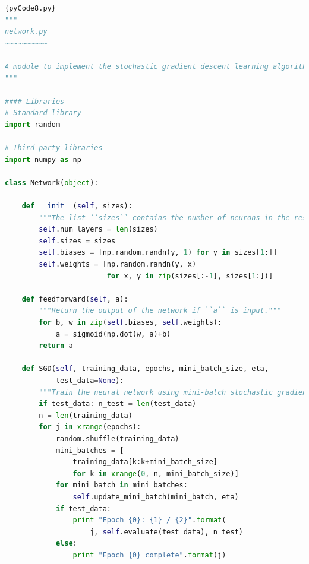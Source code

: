 \documentclass[a4paper,12pt]{report}%
\begin{document}
\begin{lstlisting}[language=Python,breaklines,basicstyle=\footnotesize\ttfamily]{pyCode8.py}
"""
network.py
~~~~~~~~~~

A module to implement the stochastic gradient descent learning algorithm for a feedforward neural network.  Gradients are calculated using backpropagation.  Note that I have focused on making the code simple, easily readable, and easily modifiable.  It is not optimized, and omits many desirable features.
"""

#### Libraries
# Standard library
import random

# Third-party libraries
import numpy as np

class Network(object):

    def __init__(self, sizes):
        """The list ``sizes`` contains the number of neurons in the respective layers of the network.  For example, if the list was [2, 3, 1] then it would be a three-layer network, with the first layer containing 2 neurons, the second layer 3 neurons, and the third layer 1 neuron.  The biases and weights for the network are initialized randomly, using a Gaussian distribution with mean 0, and variance 1.  Note that the first layer is assumed to be an input layer, and by convention we won't set any biases for those neurons, since biases are only ever used in computing the outputs from later layers."""
        self.num_layers = len(sizes)
        self.sizes = sizes
        self.biases = [np.random.randn(y, 1) for y in sizes[1:]]
        self.weights = [np.random.randn(y, x)
                        for x, y in zip(sizes[:-1], sizes[1:])]

    def feedforward(self, a):
        """Return the output of the network if ``a`` is input."""
        for b, w in zip(self.biases, self.weights):
            a = sigmoid(np.dot(w, a)+b)
        return a

    def SGD(self, training_data, epochs, mini_batch_size, eta,
            test_data=None):
        """Train the neural network using mini-batch stochastic gradient descent.  The ``training_data`` is a list of tuples ``(x, y)`` representing the training inputs and the desired outputs.  The other non-optional parameters are self-explanatory.  If ``test_data`` is provided then the network will be evaluated against the test data after each epoch, and partial progress printed out.  This is useful for tracking progress, but slows things down substantially."""
        if test_data: n_test = len(test_data)
        n = len(training_data)
        for j in xrange(epochs):
            random.shuffle(training_data)
            mini_batches = [
                training_data[k:k+mini_batch_size]
                for k in xrange(0, n, mini_batch_size)]
            for mini_batch in mini_batches:
                self.update_mini_batch(mini_batch, eta)
            if test_data:
                print "Epoch {0}: {1} / {2}".format(
                    j, self.evaluate(test_data), n_test)
            else:
                print "Epoch {0} complete".format(j)


\end{lstlisting}
\end{document}

